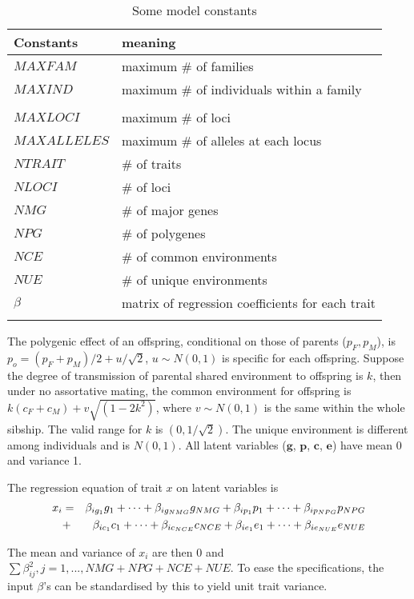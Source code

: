 \begin{table}[h]
\centering
\caption{Some model constants\label{simcons}}
\begin{tabular}{ll}
\\
\hline
Constants & meaning\\
\hline
$MAXFAM$ & maximum \# of families\\
$MAXIND$ & maximum \# of individuals within a family\\
\\
$MAXLOCI$ & maximum \# of loci\\
$MAXALLELES$ & maximum \# of alleles at each locus\\
$NTRAIT$ & \# of traits\\
$NLOCI$ & \# of loci\\
$NMG$ & \# of major genes\\
$NPG$ & \# of polygenes\\
$NCE$ & \# of common environments\\
$NUE$ & \# of unique environments\\
$\beta$ & matrix of regression coefficients for each trait\\
\\ \hline
\end{tabular}
\end{table}

The polygenic effect of an offspring, conditional on those of parents
($p_F,p_M$), is $p_o={{{(p_F+p_M)}/{2}}+{u/\sqrt{2}}}$, $u\sim N(0,1)$ is
specific for each offspring.  Suppose the degree of transmission of parental
shared environment to offspring is $k$, then under no assortative mating, the
common environment for offspring is $k (c_F+c_M)+v\sqrt{(1-2k^2)}$, where
$v\sim N(0,1)$ is the same within the whole sibship.  The valid range for $k$
is $(0,1/\sqrt{2})$.  The unique environment is different among individuals and
is $N(0,1)$.  All latent variables ($\mathbf{g}$, $\mathbf{p}$, $\mathbf{c}$,
$\mathbf{e}$) have mean 0 and variance 1.

The regression equation of trait $x$ on latent variables is
\begin{eqnarray}
x_i&=&\beta_{ig_1}g_1+\cdots+\beta_{ig_{NMG}}g_{NMG}
    + \beta_{ip_1}p_1+\cdots+\beta_{ip_{NPG}}p_{NPG} \cr
   &+&\beta_{ic_1}c_1+\cdots+\beta_{ic_{NCE}}c_{NCE}
    + \beta_{ie_1}e_1+\cdots+\beta_{ie_{NUE}}e_{NUE}
\end{eqnarray}

The mean and variance of $x_i$ are then 0 and $\sum \beta_{ij}^2, j=1,
..., NMG + NPG + NCE + NUE$. To ease the specifications, the input
$\beta$'s can be standardised by this to yield unit trait variance.

